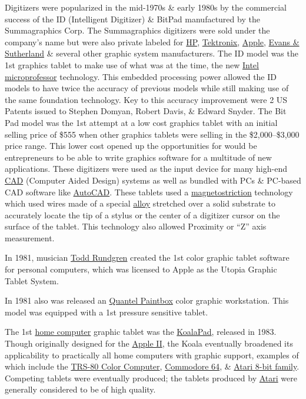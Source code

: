 \documentclass[oneside]{book}
\numberwithin{equation}{section}
\begin{document}
Digitizers were popularized in the mid-1970s \& early 1980s by the commercial success of the ID (Intelligent Digitizer) \& BitPad manufactured by the Summagraphics Corp. The Summagraphics digitizers were sold under the company's name but were also private labeled for \href{https://en.wikipedia.org/wiki/Hewlett-Packard}{HP}, \href{https://en.wikipedia.org/wiki/Tektronix}{Tektronix}, \href{https://en.wikipedia.org/wiki/Apple_Inc.}{Apple}, \href{https://en.wikipedia.org/wiki/Evans_%26_Sutherland}{Evans \& Sutherland} \& several other graphic system manufacturers. The ID model was the 1st graphics tablet to make use of what was at the time, the new \href{https://en.wikipedia.org/wiki/Microprocessor}{Intel microprofessor} technology. This embedded processing power allowed the ID models to have twice the accuracy of previous models while still making use of the same foundation technology. Key to this accuracy improvement were 2 US Patents issued to Stephen Domyan, Robert Davis, \& Edward Snyder. The Bit Pad model was the 1st attempt at a low cost graphics tablet with an initial selling price of \$555 when other graphics tablets were selling in the \$2,000--\$3,000 price range. This lower cost opened up the opportunities for would be entrepreneurs to be able to write graphics software for a multitude of new applications. These digitizers were used as the input device for many high-end \href{https://en.wikipedia.org/wiki/Computer-aided_design}{CAD} (Computer Aided Design) systems as well as bundled with PCs \& PC-based CAD software like \href{https://en.wikipedia.org/wiki/AutoCAD}{AutoCAD}. These tablets used a \href{https://en.wikipedia.org/wiki/Magnetostriction}{magnetostriction} technology which used wires made of a special \href{https://en.wikipedia.org/wiki/Alloy}{alloy} stretched over a solid substrate to accurately locate the tip of a stylus or the center of a digitizer cursor on the surface of the tablet. This technology also allowed Proximity or ``Z'' axis measurement.

In 1981, musician \href{https://en.wikipedia.org/wiki/Todd_Rundgren}{Todd Rundgren} created the 1st color graphic tablet software for personal computers, which was licensed to Apple as the Utopia Graphic Tablet System.

In 1981 also was released an \href{https://en.wikipedia.org/wiki/Quantel_Paintbox}{Quantel Paintbox} color graphic workstation. This model was equipped with a 1st pressure sensitive tablet.

The 1st \href{https://en.wikipedia.org/wiki/Home_computer}{home computer} graphic tablet was the \href{https://en.wikipedia.org/wiki/KoalaPad}{KoalaPad}, released in 1983. Though originally designed for the \href{https://en.wikipedia.org/wiki/Apple_II}{Apple II}, the Koala eventually broadened its applicability to practically all home computers with graphic support, examples of which include the \href{https://en.wikipedia.org/wiki/TRS-80_Color_Computer}{TRS-80 Color Computer}, \href{https://en.wikipedia.org/wiki/Commodore_64}{Commodore 64}, \& \href{https://en.wikipedia.org/wiki/Atari_8-bit_family}{Atari 8-bit family}. Competing tablets were eventually produced; the tablets produced by \href{https://en.wikipedia.org/wiki/Atari}{Atari} were generally considered to be of high quality.
\end{document}
